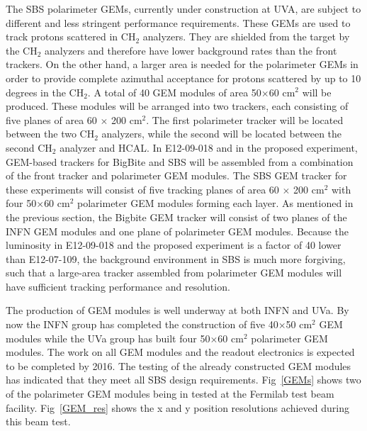 The SBS polarimeter GEMs, currently under construction at UVA, are subject to different and less stringent performance requirements. These GEMs are used to track protons scattered in CH$_2$ analyzers. They are shielded from the target by the CH$_2$ analyzers and therefore have lower background rates than the front trackers.  On the other hand, a larger area is needed for the polarimeter GEMs in order to provide complete azimuthal acceptance for protons scattered by up to 10 degrees in the CH$_2$. A total of 40 GEM modules of area 50$\times$60 cm$^2$ will be produced. These modules will be arranged into two trackers, each consisting of five planes of area 60 $\times$ 200 cm$^2$. The first polarimeter tracker will be located between the two CH$_2$ analyzers, while the second will be located between the second CH$_2$ analyzer and HCAL. %
In E12-09-018 and in the proposed experiment, GEM-based trackers for BigBite and SBS will be assembled from a combination of the front tracker and polarimeter GEM modules. The SBS GEM tracker for these experiments will consist of five tracking planes of area  60 $\times$ 200 cm$^2$  with four  50$\times$60 cm$^2$ polarimeter GEM modules forming each layer. As mentioned in the previous section, the Bigbite GEM tracker will consist of two planes of the INFN GEM modules and one plane of polarimeter GEM modules. 
%
Because the  luminosity in E12-09-018 and the proposed experiment is a factor of 40 lower than E12-07-109, the background environment in SBS is much more forgiving, such that a large-area tracker assembled from polarimeter GEM modules will have sufficient tracking performance and resolution.

The production of GEM modules is well underway at both INFN and UVa. By now the INFN group has completed the construction of five  40$\times$50 cm$^2$ GEM modules while the UVa group has built four 50$\times$60 cm$^2$ polarimeter GEM modules. The work on all  GEM modules and the readout electronics is  expected to be completed by 2016.  The testing of the already constructed GEM  modules has indicated that they meet all SBS design requirements. Fig~\ref{GEMs} shows two of the polarimeter GEM  modules being in tested at the Fermilab test beam facility. Fig~\ref{GEM_res} shows the x and y position resolutions achieved during this beam test.

